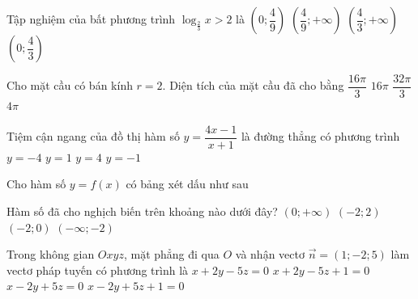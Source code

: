 \begin{ex}%
	Tập nghiệm của bất phương trình $\log _{\frac{2}{3}}x>2$ là
	\choice
	{\True $\left(0 ; \dfrac{4}{9}\right)$}
	{$\left(\dfrac{4}{9};+\infty\right)$}
	{$\left(\dfrac{4}{3};+\infty\right)$}
	{$\left(0 ; \dfrac{4}{3}\right)$}
\end{ex}
\begin{ex}%
	Cho mặt cầu có bán kính $r=2$. Diện tích của mặt cầu đã cho bằng
	\choice
	{$\dfrac{16 \pi}{3}$}
	{\True $16 \pi$}
	{$\dfrac{32 \pi}{3}$}
	{$4 \pi$}
\end{ex}
\begin{ex}%
	Tiệm cận ngang của đồ thị hàm số $y=\dfrac{4 x-1}{x+1}$ là đường thẳng có phương trình
	\choice
	{$y=-4$}
	{$y=1$}
	{\True $y=4$}
	{$y=-1$}
\end{ex}
\begin{ex}%
	Cho hàm số $y=f(x)$ có bảng xét dấu như sau
	\begin{center}
	\end{center}
	Hàm số đã cho nghịch biến trên khoảng nào dưới đây?
	\choice
	{$(0;+\infty)$}
	{$(-2;2)$}
	{\True $(-2;0)$}
	{$(-\infty;-2)$}
\end{ex}

\begin{ex}%
	Trong không gian $Oxyz$, mặt phẳng đi qua $O$ và nhận vectơ $\vec{n}=(1;-2;5)$ làm vectơ pháp tuyến có phương trình là
	\choice
	{$x+2y-5z=0$}
	{$x+2y-5z+1=0$}
	{\True $x-2y+5z=0$}
	{$x-2y+5z+1=0$}
\end{ex}

